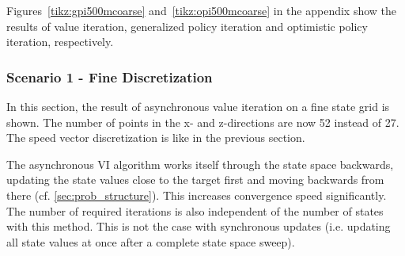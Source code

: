Figures~\ref{tikz:gpi500mcoarse} and~\ref{tikz:opi500mcoarse} in the appendix show the results of value iteration, generalized policy iteration and optimistic policy iteration, respectively.

\subsubsection{Scenario 1 - Fine Discretization}

In this section, the result of asynchronous value iteration on a fine state grid is shown. The number of points in the x- and z-directions are now 52 instead of 27. The speed vector discretization is like in the previous section.

The asynchronous VI algorithm works itself through the state space backwards, updating the state values close to the target first and moving backwards from there (cf. \ref{sec:prob_structure}). This increases convergence speed significantly. The number of required iterations is also independent of the number of states with this method. This is not the case with synchronous updates (i.e. updating all state values at once after a complete state space sweep). 

